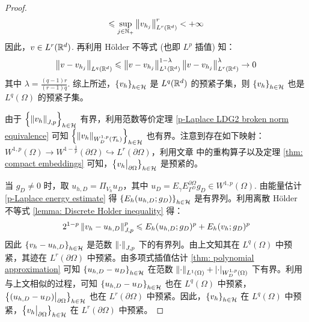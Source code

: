 \begin{theorem}
\begin{proof}
\begin{equation*}
			\leqslant \sup_{j \in \mathbb{N}_+} \left\lVert v_{h_{j}}\right\rVert_{L^{r}(\mathbb{R}^{d})}^{r} 
			< +\infty
		\end{equation*}
		因此，\(v \in L^{r}(\mathbb{R}^{d})\). 再利用 H\"{o}lder 不等式 (也即 \(L^{p}\) 插值) 知：
		\begin{equation*}
			\left\lVert v - v_{h_{j}}\right\rVert_{L^{q}(\mathbb{R}^{d})} 
			\leqslant \left\lVert v - v_{h_{j}}\right\rVert_{L^{1}(\mathbb{R}^{d})}^{1-\lambda} \left\lVert v - v_{h_{j}}\right\rVert_{L^{r}(\mathbb{R}^{d})}^{\lambda} 
			\to 0
		\end{equation*}
		其中 \(\lambda = \frac{(q-1)r}{(r-1)q}\). 综上所述，\(\left\{v_{h}\right\}_{h \in \mathcal{H}}\) 是 \(L^{q}(\mathbb{R}^{d})\) 的预紧子集，则 \(\left\{v_{h}\right\}_{h \in \mathcal{H}}\) 也是 \(L^{q}(\Omega)\) 的预紧子集。

		由于 \(\left\{\left\lVert v_{h}\right\rVert_{J, p}\right\}_{h \in \mathcal{H}}\) 有界，利用范数等价定理 \ref{p-Laplace LDG2 broken norm equivalence} 可知 \(\left\{\left\lVert v_{h}\right\rVert_{W^{1,p}_{D}(\mathcal{T}_{h})}\right\}_{h \in \mathcal{H}}\) 也有界。注意到存在如下映射：\(W^{1, p}(\Omega) \to W^{1-\frac{1}{p}}(\partial\Omega) \hookrightarrow L^{r}(\partial\Omega)\)，利用文章 \cite{10.1093/imanum/drn038} 中的重构算子以及定理 \ref{thm: compact embeddings} 可知，\(\left\{v_{h}\big|_{\partial\Omega}\right\}_{h \in \mathcal{H}}\) 是预紧的。

		当 \(g_{D} \neq 0\) 时，取 \(u_{h, D} = \Pi_{V_{h}} u_{D}\)，其中 \(u_{D} = E_{\gamma} E_{\Gamma^{D}}^{\partial\Omega} g_{D} \in W^{1,p}(\Omega)\). 由能量估计 \ref{p-Laplace energy estimate} 得 \(\left\{E_{h}(u_{h, D}; g_{D})\right\}_{h \in \mathcal{H}}\) 是有界列。利用离散 H\"{o}lder 不等式 \ref{lemma: Discrete Holder inequality} 得：
		\begin{equation*}
			2^{1-p} \left\lVert v_{h} - u_{h, D}\right\rVert_{J, p}^{p} 
			\leqslant E_{h}(u_{h, D}; g_{D})^{p} + E_{h}(v_{h}; g_{D})^{p}
		\end{equation*}
		因此 \(\left\{v_{h} - u_{h, D}\right\}_{h \in \mathcal{H}}\) 是范数 \(\left\lVert\cdot\right\rVert_{J, p}\) 下的有界列。由上文知其在 \(L^{q}(\Omega)\) 中预紧，其迹在 \(L^{r}(\partial\Omega)\) 中预紧。由多项式插值估计 \ref{thm: polynomial approximation} 可知 \(\left\{u_{h, D} - u_{D}\right\}_{h \in \mathcal{H}}\) 在范数 \(\left\lVert\cdot\right\rVert_{L^{1}(\Omega)} + \left\lvert\cdot\right\rvert_{W^{1,p}_{D}(\Omega)}\) 下有界。利用与上文相似的过程，可知 \(\left\{u_{h, D} - u_{D}\right\}_{h \in \mathcal{H}}\) 也在 \(L^{q}(\Omega)\) 中预紧，\(\left\{(u_{h, D} - u_{D})\big|_{\partial\Omega}\right\}_{h \in \mathcal{H}}\) 也在 \(L^{r}(\partial\Omega)\) 中预紧。因此，\(\left\{v_{h}\right\}_{h \in \mathcal{H}}\) 在 \(L^{q}(\Omega)\) 中预紧，\(\left\{v_{h}\big|_{\partial\Omega}\right\}_{h \in \mathcal{H}}\) 在 \(L^{r}(\partial\Omega)\) 中预紧。
		\fi
	\end{proof}
\end{theorem}


